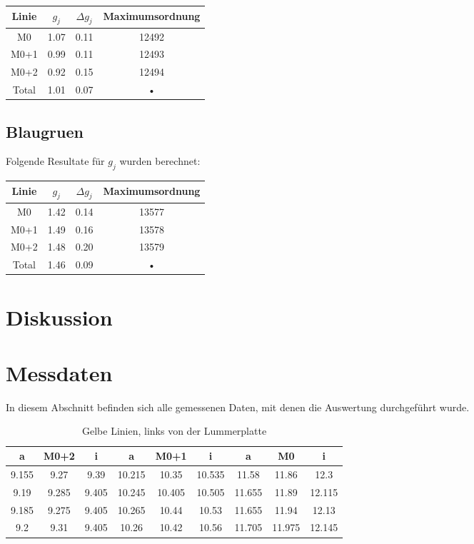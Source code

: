 \documentclass[a4paper,parskip,11pt, DIV12]{scrreprt}
\begin{document}
\begin{tabular}{|c|c|c|c|}
\hline 
Linie  & $g_j$ & $\Delta g_j$ & Maximumsordnung \\ 
\hline 
M0 & 1.07 & 0.11 & 12492 \\ 
\hline 
M0+1 & 0.99 & 0.11 & 12493 \\ 
\hline 
M0+2 & 0.92 & 0.15 & 12494 \\ 
\hline 
Total & 1.01 & 0.07 & • \\ 
\hline 
\end{tabular} 
	\section{Blaugruen}
	Folgende Resultate für $g_j$ wurden berechnet:
	
\begin{tabular}{|c|c|c|c|}
\hline 
Linie  & $g_j$ & $\Delta g_j$ & Maximumsordnung \\ 
\hline 
M0 & 1.42 & 0.14 & 13577 \\ 
\hline 
M0+1 & 1.49 & 0.16 & 13578 \\ 
\hline 
M0+2 & 1.48 & 0.20 & 13579 \\ 
\hline 
Total & 1.46 & 0.09 & • \\ 
\hline 
\end{tabular} 
	\chapter{Diskussion}
	
	\chapter{Messdaten}
	In diesem Abschnitt befinden sich alle gemessenen Daten, mit denen die Auswertung durchgeführt wurde.
	
	\begin{table}[H]
	\begin{tabular}{|c|c|c||c|c|c||c|c|c|}
	\hline 
a	&	M0+2	&	i	&	a	&	M0+1	&	i	&	a	&	M0	&	i	\\
	\hline
	\hline
9.155	&	9.27	&	9.39	&	10.215	&	10.35	&	10.535	&	11.58	&	11.86	&	12.3	\\
	\hline
9.19	&	9.285	&	9.405	&	10.245	&	10.405	&	10.505	&	11.655	&	11.89	&	12.115	\\
	\hline
9.185	&	9.275	&	9.405	&	10.265	&	10.44	&	10.53	&	11.655	&	11.94	&	12.13	\\
	\hline
9.2	&	9.31	&	9.405	&	10.26	&	10.42	&	10.56	&	11.705	&	11.975	&	12.145	\\
	\hline
	\end{tabular}
	\caption{Gelbe Linien, links von der Lummerplatte}
	\end{table}
	
\end{document}
